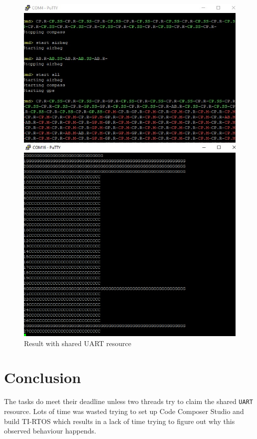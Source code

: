 \documentclass[10pt]{article}
\begin{document}
\begin{figure}[H]
\caption{Result with shared UART resource}
\label{res}
\centering
\includegraphics[width=0.9\linewidth]{./images/result.jpeg}
\end{figure}
\newpage

\section*{Conclusion}
The tasks do meet their deadline unless two threads try to claim the shared \texttt{UART} resource.
Lots of time was wasted trying to set up Code Composer Studio and build TI-RTOS which results in a lack of time trying to figure out why this observed behaviour happends.
\end{document}
